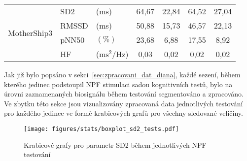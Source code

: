 \begin{table}[h]
\begin{threeparttable}
\begin{tabular*}{\linewidth}{@{\extracolsep{\fill}} lllcccc @{}}
            \multirow[t]{4}{*}{MotherShip3} & SD2                                  & (ms)                           & 64,67                          & 22,84       & 64,52           & 27,04       \\
            & RMSSD                                 & (ms)                           & 50,88                          & 15,73       & 46,57           & 22,13       \\
            & pNN50                                 & $(\%)$                         & 23,68                          & 6,88        & 17,55           & 8,92        \\
            & HF                                    & ($\text{ms}^2$/Hz)                    & 0,03                           & 0,02        & 0,02            & 0,02        \\
            \bottomrule
        \end{tabular*}
    \end{threeparttable}
    \label{tab:tests_params_mothership}
\end{table}

Jak již bylo popsáno v sekci~\ref{sec:zpracovani_dat_diana}, každé sezení, během
kterého jedinec podstoupil \gls{NPF} stimulaci sadou kognitivních testů, bylo na
úrovni zaznamenaných biosignálu během testování segmentováno a zpracováno. Ve
zbytku této sekce jsou vizualizovány zpracovaná data jednotlivých testování pro
každého jedince ve formě krabicových grafů pro všechny sledované veličiny.

\begin{figure}[h]
    \begin{center}
        \texttt{[image: figures/stats/boxplot\_sd2\_tests.pdf]}
        \caption{Krabicové grafy pro parametr SD2 během jednotlivých NPF testování}
        \label{fig:results_boxplot_SD2_tests}
    \end{center}
    \vspace{-20mm}
\end{figure}

